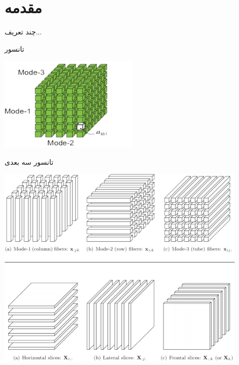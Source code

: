 \section{مقدمه}

\begin{frame}[standout]
چند تعریف...
\end{frame}
\begin{frame}{تانسور}
\begin{center}
	\includegraphics[width=0.5\textwidth]{img/ok/tensor3d.pdf}
\end{center}
\begin{center}
	تانسور سه بعدی
\end{center}
\end{frame}
\begin{frame}
\begin{center}
\includegraphics[width=0.9\textwidth]{img/ok/slice.pdf}
\end{center}
\end{frame}
